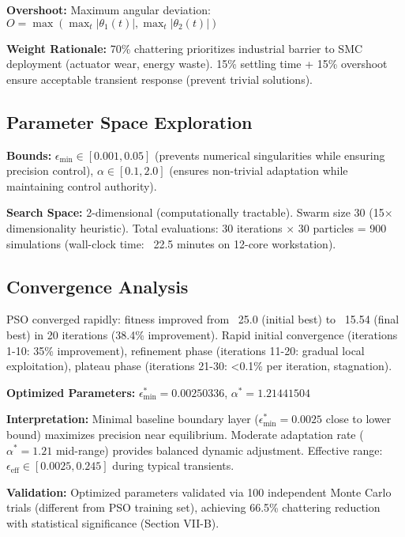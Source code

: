 \documentclass[conference]{IEEEtran}
\begin{document}
\textbf{Overshoot:} Maximum angular deviation: $O = \max(\max_t |\theta_1(t)|, \max_t |\theta_2(t)|)$

\textbf{Weight Rationale:} 70\% chattering prioritizes industrial barrier to SMC deployment (actuator wear, energy waste). 15\% settling time + 15\% overshoot ensure acceptable transient response (prevent trivial solutions).

\subsection{Parameter Space Exploration}

\textbf{Bounds:} $\epsilon_{\min} \in [0.001, 0.05]$ (prevents numerical singularities while ensuring precision control), $\alpha \in [0.1, 2.0]$ (ensures non-trivial adaptation while maintaining control authority).

\textbf{Search Space:} 2-dimensional (computationally tractable). Swarm size 30 (15$\times$ dimensionality heuristic). Total evaluations: 30 iterations $\times$ 30 particles = 900 simulations (wall-clock time: ~22.5 minutes on 12-core workstation).

\subsection{Convergence Analysis}

PSO converged rapidly: fitness improved from ~25.0 (initial best) to ~15.54 (final best) in 20 iterations (38.4\% improvement). Rapid initial convergence (iterations 1-10: 35\% improvement), refinement phase (iterations 11-20: gradual local exploitation), plateau phase (iterations 21-30: <0.1\% per iteration, stagnation).

\textbf{Optimized Parameters:} $\epsilon_{\min}^* = 0.00250336$, $\alpha^* = 1.21441504$

\textbf{Interpretation:} Minimal baseline boundary layer ($\epsilon_{\min}^* = 0.0025$ close to lower bound) maximizes precision near equilibrium. Moderate adaptation rate ($\alpha^* = 1.21$ mid-range) provides balanced dynamic adjustment. Effective range: $\epsilon_{\text{eff}} \in [0.0025, 0.245]$ during typical transients.

\textbf{Validation:} Optimized parameters validated via 100 independent Monte Carlo trials (different from PSO training set), achieving 66.5\% chattering reduction with statistical significance (Section VII-B).

\end{document}
